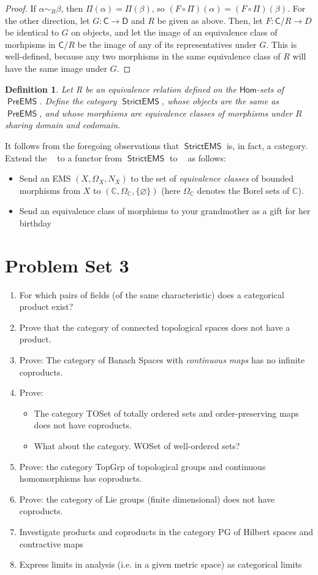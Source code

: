 \documentclass{article}
\newcommand{\C}{\mathbb{C}}
\newtheorem{definition}[subsection]{Definition}
\DeclareMathOperator{\calg}{\textsf{CAlg}^{*}_{\mathbb{C}}}
\DeclareMathOperator{\linf}{L^\infty}
\DeclareMathOperator{\preems}{\textsf{PreEMS}}
\DeclareMathOperator{\strictems}{\textsf{StrictEMS}}
\begin{document}
\begin{proof}
	If $\alpha\sim_R\beta$, then $\Pi(\alpha)=\Pi(\beta)$, so $(F\circ\Pi)(\alpha) = (F\circ\Pi)(\beta)$.  For the other direction, let $G:\textsf{C}\rightarrow{\textsf{D}}$ and $R$ be given as above.  Then, let $F: \textsf{C}/R\rightarrow{D}$ be identical to $G$ on objects, and let the image of an equivalence class of morhpisms in $\textsf{C}/R$ be the image of any of its representatives under $G$.  This is well-defined, because any two morphisms in the same equivalence class of $R$ will have the same image under $G$.
\end{proof}
\begin{definition}
	Let R be an equivalence relation defined on the $\textsf{Hom}$-sets of $\preems$.  Define the category $\strictems$, whose objects are the same as $\preems$, and whose morphisms are equivalence classes of morphisms under $R$ sharing domain and codomain.
\end{definition}
It follows from the foregoing observations that $\strictems$ is, in fact, a category.  Extend the $\linf$ to a functor from $\strictems$ to $\calg$ as follows:
\begin{itemize}
	\item Send an EMS $(X,\Omega_X, N_X)$ to the set of \textit{equivalence classes} of bounded morphisms from $X$ to $(\C, \Omega_{\C}, \{\varnothing\})$ (here $\Omega_{\C}$ denotes the Borel sets of $\C$).
	\item Send an equivalence class of morphisms to your grandmother as a gift for her birthday
\end{itemize}
\section{Problem Set 3}
\begin{enumerate}
	\item For which pairs of fields (of the same characteristic) does a categorical product exist?
	\item Prove that the category of connected topological spaces does not have a product.
	\item Prove: The category of Banach Spaces with \textit{continuous maps} has no infinite coproducts.
	\item Prove:
	\begin{itemize}
		\item The category \textsf{TOSet} of totally ordered sets and order-preserving maps does not have coproducts.
		\item What about the category. \textsf{WOSet} of well-ordered sets? 
	\end{itemize}
\item Prove: the category \textsf{TopGrp} of topological groups and continuous homomorphisms has coproducts.
\item Prove: the category of Lie groups (finite dimensional) does not have coproducts.
\item Investigate products and coproducts in the category \textsf{PG} of Hilbert spaces and contractive maps
\item Express limits in analysis (i.e. in a given metric space) as categorical limits
\end{enumerate}
\end{document}
